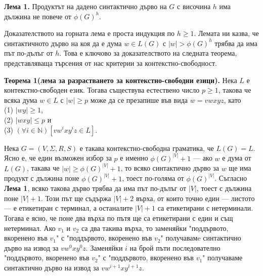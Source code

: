 \documentclass{article}
\begin{document}
\vspace{15pt}

\textbf{Лема 1.} Продуктът на дадено синтактично дърво на $G$ с височина $h$ има дължина
не повече от $\phi(G)^h$.

\vspace{15pt}
\hspace{15pt} Доказателството на горната лема е проста индукция по $h \geq 1$. Лемата 
ни казва, че синтактичното дърво на коя да е дума $w \in L(G)$ с $|w| > \phi(G)^h$ трябва да
има път по-дълъг от $h$. Това е ключово за доказателството на следната теорема, 
представляваща търсения от нас критерии за контекстно-свободност. \\

\vspace{15pt}

\textbf{Теорема 1(лема за разрастването за контекстно-свободни езици).} Нека 
$L$ е контекстно-свободен език. Тогава съществува естествено 
число $p \geq 1$, такова че всяка дума $w \in L$ с $|w| \geq p$ може да се презапише
във вида $w = vwxyz$, като \\
(1) $|wy| \geq 1$, \\
(2) $|wxy| \leq p$ и \\
(3) $(\forall i \in \mathbb{N})[vw^ixy^iz \in L]$. \\

\vspace{15pt}

\hspace{15pt}Нека $G = (V,\Sigma,R,S)$ е такава контекстно-свободна граматика, че $L(G) = L$. 
Ясно е, че един възможен избор за $p$ е именно $\phi(G)^{|V|}+1$ — ако $w$ е дума от 
$L(G)$, такава че $|w| \geq \phi(G)^{|V|}+1$, то всяко синтактично дърво за $w$ ще има
продукт с дължина поне $\phi(G)^{|V|}+1$, тоест по-голяма от $\phi(G)^{|V|}$. Съгласно
\textbf{Лема 1}, всяко такова дърво трябва да има път по-дълъг от $|V|$, тоест с дължина
поне $|V| + 1$. Този път ще съдържа $|V| + 2$ върха, от които точно един — листото — е 
етикетиран с терминал, а останалите $|V| + 1$ са етикетирани с нетерминали. Тогава е
ясно, че поне два върха по пътя ще са етикетирани с един и същ нетерминал. Ако 
$v_1$ и $v_2$ са два такива върха, то заменяйки "поддървото, вкоренено във $v_1$" \hspace{0,01cm} с
"поддървото, вкоренено във $v_2$" \hspace{0,01cm} получавамe синтактично дърво на извод за $vw^0xy^0z$.
Заменяйки $i$ на брой пъти последователно "поддървото, вкоренено във $v_2$" \hspace{0,01cm} с
"поддървото, вкоренено във $v_1$" \hspace{0,01cm} получаваме синтактично дърво на извод
за $vw^{i+1}xy^{i+1}z$.
\end{document}
